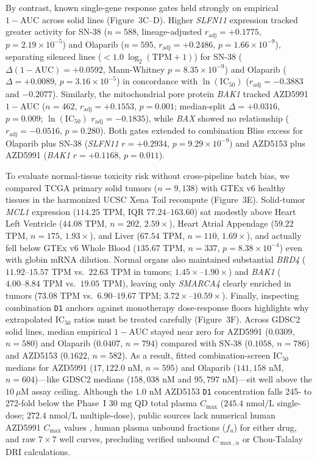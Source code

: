 \documentclass[10pt,twocolumn]{article}
\begin{document}
By contrast, known single-gene response gates held strongly on empirical $1 - \text{AUC}$ across solid lines (Figure~3C--D). Higher \textit{SLFN11} expression tracked greater activity for SN-38 ($n = 588$, lineage-adjusted $r_{\text{adj}} = +0.1775$, $p = 2.19 \times 10^{-5}$) and Olaparib ($n = 595$, $r_{\text{adj}} = +0.2486$, $p = 1.66 \times 10^{-9}$), separating silenced lines ($< 1.0\ \log_2(\text{TPM}+1)$) for SN-38 ($\Delta(1 - \text{AUC}) = +0.0592$, Mann-Whitney $p = 8.35 \times 10^{-9}$) and Olaparib ($\Delta = +0.0089$, $p = 3.16 \times 10^{-5}$) in concordance with $\ln(\text{IC}_{50})$ ($r_{\text{adj}} = -0.3883$ and $-0.2077$). Similarly, the mitochondrial pore protein \textit{BAK1} tracked AZD5991 $1 - \text{AUC}$ ($n = 462$, $r_{\text{adj}} = +0.1553$, $p = 0.001$; median-split $\Delta = +0.0316$, $p = 0.009$; $\ln(\text{IC}_{50})$ $r_{\text{adj}} = -0.1835$), while \textit{BAX} showed no relationship ($r_{\text{adj}} = -0.0516$, $p = 0.280$). Both gates extended to combination Bliss excess for Olaparib plus SN-38 (\textit{SLFN11} $r = +0.2934$, $p = 9.29 \times 10^{-9}$) and AZD5153 plus AZD5991 (\textit{BAK1} $r = +0.1168$, $p = 0.011$).

To evaluate normal-tissue toxicity risk without cross-pipeline batch bias, we compared TCGA primary solid tumors ($n = 9,138$) with GTEx v6 healthy tissues in the harmonized UCSC Xena Toil recompute \cite{vivian2017} (Figure~3E). Solid-tumor \textit{MCL1} expression ($114.25$ TPM, IQR $77.24\text{--}163.60$) sat modestly above Heart Left Ventricle ($44.08$ TPM, $n = 202$, $2.59\times$), Heart Atrial Appendage ($59.22$ TPM, $n = 175$, $1.93\times$), and Liver ($67.54$ TPM, $n = 110$, $1.69\times$), and actually fell below GTEx v6 Whole Blood ($135.67$ TPM, $n = 337$, $p = 8.38 \times 10^{-4}$) even with globin mRNA dilution. Normal organs also maintained substantial \textit{BRD4} ($11.92\text{--}15.57$ TPM vs.\ $22.63$ TPM in tumors; $1.45\times\text{--}1.90\times$) and \textit{BAK1} ($4.00\text{--}8.84$ TPM vs.\ $19.05$ TPM), leaving only \textit{SMARCA4} clearly enriched in tumors ($73.08$ TPM vs.\ $6.90\text{--}19.67$ TPM; $3.72\times\text{--}10.59\times$). Finally, inspecting combination \texttt{D1} anchors against monotherapy dose-response floors highlights why extrapolated $\text{IC}_{50}$ ratios must be treated carefully (Figure~3F). Across GDSC2 solid lines, median empirical $1 - \text{AUC}$ stayed near zero for AZD5991 ($0.0309$, $n = 580$) and Olaparib ($0.0407$, $n = 794$) compared with SN-38 ($0.1058$, $n = 786$) and AZD5153 ($0.1622$, $n = 582$). As a result, fitted combination-screen $\text{IC}_{50}$ medians for AZD5991 ($17,122.0\text{ nM}$, $n = 595$) and Olaparib ($141,158\text{ nM}$, $n = 604$)---like GDSC2 medians ($158,038\text{ nM}$ and $95,797\text{ nM}$)---sit well above the $10\ \mu\text{M}$ assay ceiling. Although the $1.0\text{ nM}$ AZD5153 \texttt{D1} concentration falls 245- to 272-fold below the Phase~I $30\text{ mg}$ QD total plasma $C_{\max}$ \cite{hamilton2023} ($245.4\text{ nmol/L}$ single-dose; $272.4\text{ nmol/L}$ multiple-dose), public sources lack numerical human AZD5991 $C_{\max}$ values \cite{desai2024}, human plasma unbound fractions ($f_u$) for either drug, and raw $7 \times 7$ well curves, precluding verified unbound $C_{\max, u}$ or Chou-Talalay DRI calculations.
\end{document}
